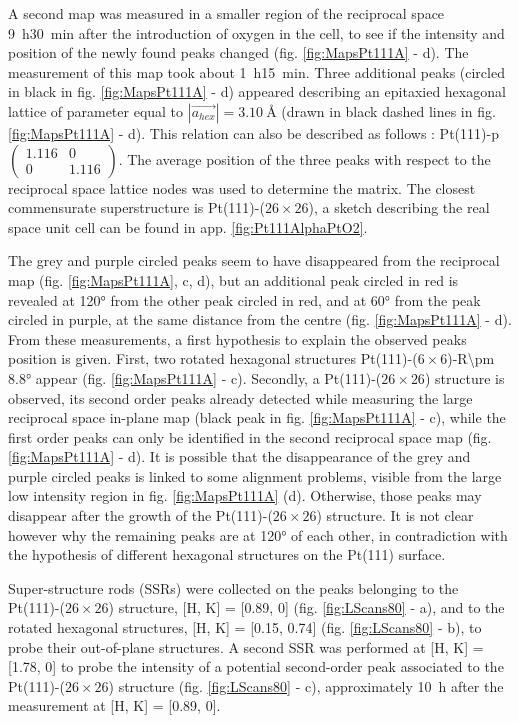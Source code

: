 A second map was measured in a smaller region of the reciprocal space \qty{9}{\hour}\qty{30}{\minute} after the introduction of oxygen in the cell, to see if the intensity and position of the newly found peaks changed (fig. \ref{fig:MapsPt111A} - d).
The measurement of this map took about \qty{1}{\hour}\qty{15}{\minute}.
Three additional peaks (circled in black in fig. \ref{fig:MapsPt111A} - d) appeared describing an epitaxied hexagonal lattice of parameter equal to $|\vec{a_{hex}}| = \qty{3.10}{\angstrom}$ (drawn in black dashed lines in fig. \ref{fig:MapsPt111A} - d).
This relation can also be described as follows : Pt(111)-p$\begin{pmatrix} 1.116 & 0 \\ 0 & 1.116 \end{pmatrix}$.
The average position of the three peaks with respect to the reciprocal space lattice nodes was used to determine the matrix.
The closest commensurate superstructure is Pt(111)-($26\times26$), a sketch describing the real space unit cell can be found in app. \ref{fig:Pt111AlphaPtO2}.

The grey and purple circled peaks seem to have disappeared from the reciprocal map (fig. \ref{fig:MapsPt111A}, c, d), but an additional peak circled in red is revealed at \ang{120} from the other peak circled in red, and at \ang{60} from the peak circled in purple, at the same distance from the centre (fig. \ref{fig:MapsPt111A} - d).
From these measurements, a first hypothesis to explain the observed peaks position is given.
First, two rotated hexagonal structures Pt(111)-($6\times6$)-R\ang{\pm 8.8} appear (fig. \ref{fig:MapsPt111A} - c).
Secondly, a Pt(111)-($26\times26$) structure is observed, its second order peaks already detected while measuring the large reciprocal space in-plane map (black peak in fig. \ref{fig:MapsPt111A} - c), while the first order peaks can only be identified in the second reciprocal space map (fig. \ref{fig:MapsPt111A} - d).
It is possible that the disappearance of the grey and purple circled peaks is linked to some alignment problems, visible from the large low intensity region in fig. \ref{fig:MapsPt111A} (d).
Otherwise, those peaks may disappear after the growth of the Pt(111)-($26\times26$) structure.
It is not clear however why the remaining peaks are at \ang{120} of each other, in contradiction with the hypothesis of different hexagonal structures on the Pt(111) surface.

Super-structure rods (SSRs) were collected on the peaks belonging to the Pt(111)-($26\times26$) structure, [H, K] = [0.89, 0] (fig. \ref{fig:LScans80} - a), and to the rotated hexagonal structures, [H, K] = [0.15, 0.74] (fig. \ref{fig:LScans80} - b), to probe their out-of-plane structures.
A second SSR was performed at [H, K] = [1.78, 0] to probe the intensity of a potential second-order peak associated to the Pt(111)-($26\times26$) structure (fig. \ref{fig:LScans80} - c), approximately \qty{10}{\hour} after the measurement at [H, K] = [0.89, 0].

